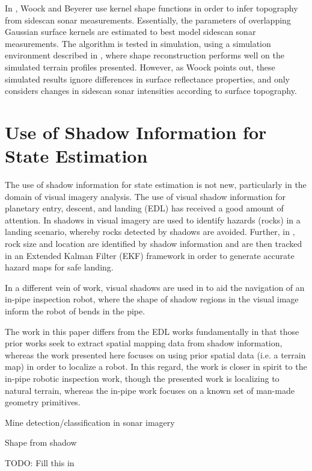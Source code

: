 In \cite{Woock2014}, Woock and Beyerer use kernel shape functions in order to infer topography from sidescan sonar measurements.
Essentially, the parameters of overlapping Gaussian surface kernels are estimated to best model sidescan sonar measurements.
The algorithm is tested in simulation, using a simulation environment described in \cite{Woock2013}, where shape reconstruction performs well on the simulated terrain profiles presented.
However, as Woock points out, these simulated results ignore differences in surface reflectance properties, and only considers changes in sidescan sonar intensities according to surface topography.

\section{Use of Shadow Information for State Estimation}
\label{related.Shadow}

The use of shadow information for state estimation is not new, particularly in the domain of visual imagery analysis. 
The use of visual shadow information for planetary entry, descent, and landing (EDL) has received a good amount of attention. 
In \cite{Matthies2008} shadows in visual imagery are used to identify hazards (rocks) in a landing scenario, whereby rocks detected by shadows are avoided. 
Further, in \cite{Crane2013}, rock size and location are identified by shadow information and are then tracked in an Extended Kalman Filter (EKF) framework in order to generate accurate hazard maps for safe landing. 

In a different vein of work, visual shadows are used in \cite{Lee2009} to aid the navigation of an in-pipe inspection robot, where the shape of shadow regions in the visual image inform the robot of bends in the pipe.  

The work in this paper differs from the EDL works fundamentally in that those prior works seek to extract spatial mapping data from shadow information, whereas the work presented here focuses on using prior spatial data (i.e. a terrain map) in order to localize a robot.  In this regard, the work is closer in spirit to the in-pipe robotic inspection work, though the presented work is localizing to natural terrain, whereas the in-pipe work focuses on a known set of man-made geometry primitives.

Mine detection/classification in sonar imagery

Shape from shadow

TODO: Fill this in

